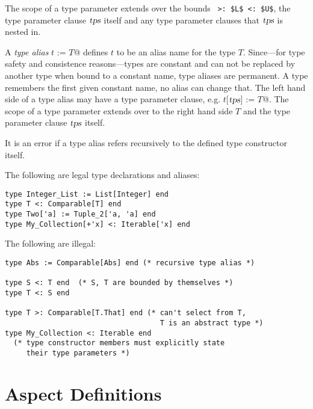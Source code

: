 The scope of a type parameter extends over the bounds ~\lstinline!>: $L$ <: $U$!, the type parameter clause $\mbox{\sl tps}$ itself and any type parameter clauses that $\mbox{\sl tps}$ is nested in.

A {\em type alias} \lstinline@type $t$ := $T$@ defines $t$ to be an alias name for the type $T$. Since---for type safety and consistence reasons---types are constant and can not be replaced by another type when bound to a constant name, type aliases are permanent. A type remembers the first given constant name, no alias can change that. The left hand side of a type alias may have a type parameter clause, e.g. \lstinline@type $t$[$\mbox{\sl tps}$] := $T$@. The scope of a type parameter extends over to the right hand side $T$ and the type parameter clause $\mbox{\sl tps}$ itself. 

It is an error if a type alias refers recursively to the defined type constructor itself. 

\example The following are legal type declarations and aliases:
\begin{lstlisting}
type Integer_List := List[Integer] end
type T <: Comparable[T] end
type Two['a] := Tuple_2['a, 'a] end
type My_Collection[+'x] <: Iterable['x] end
\end{lstlisting}

The following are illegal:
\begin{lstlisting}
type Abs := Comparable[Abs] end (* recursive type alias *)

type S <: T end  (* S, T are bounded by themselves *)
type T <: S end

type T >: Comparable[T.That] end (* can't select from T,
                                    T is an abstract type *)
type My_Collection <: Iterable end
  (* type constructor members must explicitly state
     their type parameters *)
\end{lstlisting}





\section{Aspect Definitions}
\label{sec:aspects}

